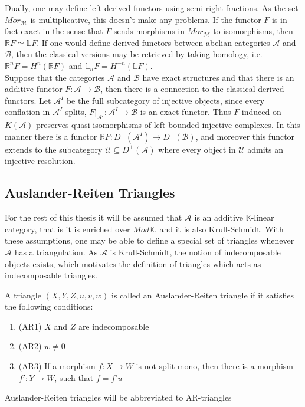         Dually, one may define left derived functors using semi right fractions. As the set $Mor_{\mathcal{M}}$ is multiplicative, this doesn't make any problems. If the functor $F$ is in fact exact in the sense that $F$ sends morphisms in $Mor_{\mathcal{M}}$ to isomorphisms, then $\mathbb{R}F \simeq \mathbb{L}F$. If one would define derived functors between abelian categories $\mathcal{A}$ and $\mathcal{B}$, then the classical versions may be retrieved by taking homology, i.e. $\mathbb{R}^nF = H^n(\mathbb{R}F)$ and $\mathbb{L}_nF = H^{-n}(\mathbb{L}F)$. \\
        
        Suppose that the categories $\mathcal{A}$ and $\mathcal{B}$ have exact structures and that there is an additive functor $F:\mathcal{A}\rightarrow \mathcal{B}$, then there is a connection to the classical derived functors. Let $\mathcal{A}^I$ be the full subcategory of injective objects, since every conflation in $\mathcal{A}^I$ splits, $F|_{\mathcal{A}^{I}}:\mathcal{A}^I\rightarrow \mathcal{B}$ is an exact functor. Thus $F$ induced on $K(\mathcal{A})$ preserves quasi-isomorphisms of left bounded injective complexes. In this manner there is a functor $\mathbb{R}F:D^+(\mathcal{A}^I)\rightarrow D^+(\mathcal{B})$, and moreover this functor extends to the subcategory $\mathcal{U}\subseteq D^+(\mathcal{A})$ where every object in $\mathcal{U}$ admits an injective resolution. \\

    \subsection{Auslander-Reiten Triangles}

        For the rest of this thesis it will be assumed that $\mathcal{A}$ is an additive $\mathbb{K}$-linear category, that is it is enriched over $Mod \mathbb{K}$, and it is also Krull-Schmidt. With these assumptions, one may be able to define a special set of triangles whenever $\mathcal{A}$ has a triangulation. As $\mathcal{A}$ is Krull-Schmidt, the notion of indecomposable objects exists, which motivates the definition of triangles which acts as indecomposable triangles.

        \begin{definition}
            A triangle $(X,Y,Z,u,v,w)$ is called an Auslander-Reiten triangle if it satisfies the following conditions:
            \begin{enumerate}
                \item (AR1) $X$ and $Z$ are indecomposable
                \item (AR2) $w\neq 0$
                \item (AR3) If a morphism $f:X\rightarrow W$ is not split mono, then there is a morphism $f':Y\rightarrow W$, such that $f=f'u$
            \end{enumerate}
            Auslander-Reiten triangles will be abbreviated to AR-triangles
        \end{definition}

